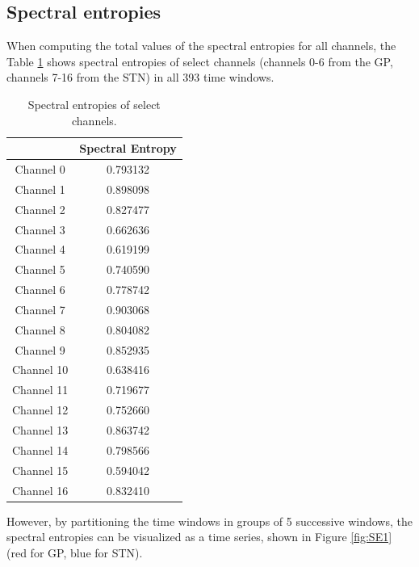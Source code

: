 \documentclass{kththesis}
\begin{document}
\subsection{Spectral entropies}

When computing the total values of the spectral entropies for all channels, the Table \ref{tab:spec_entr} shows spectral entropies of select channels (channels 0-6 from the GP, channels 7-16 from the STN) in all 393 time windows.

\begin{table}[H]
    \centering
    \begin{tabular}{|c|c|}
    \hline
                & Spectral Entropy \\ \hline
     Channel 0  & 0.793132         \\ \hline
     Channel 1  & 0.898098         \\ \hline
     Channel 2  & 0.827477         \\ \hline
     Channel 3  & 0.662636         \\ \hline
     Channel 4  & 0.619199         \\ \hline
     Channel 5  & 0.740590         \\ \hline
     Channel 6  & 0.778742         \\ \hline
     Channel 7  & 0.903068         \\ \hline
     Channel 8  & 0.804082         \\ \hline
     Channel 9  & 0.852935         \\ \hline
     Channel 10 & 0.638416         \\ \hline
     Channel 11 & 0.719677         \\ \hline
     Channel 12 & 0.752660         \\ \hline
     Channel 13 & 0.863742         \\ \hline
     Channel 14 & 0.798566         \\ \hline
     Channel 15 & 0.594042         \\ \hline
     Channel 16 & 0.832410         \\ \hline
    \end{tabular}
    \caption{Spectral entropies of select channels.}
    \label{tab:spec_entr}
\end{table}

However, by partitioning the time windows in groups of 5 successive windows, the spectral entropies can be visualized as a time series, shown in Figure \ref{fig:SE1} (red for GP, blue for STN).  
\end{document}

